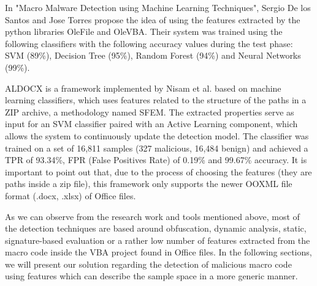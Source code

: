 \par
In "Macro Malware Detection using Machine Learning Techniques"\cite{SantosT17}, Sergio De los Santos and Jose Torres propose the idea of using the features extracted by the python libraries OleFile and OleVBA. Their system was trained  using the following classifiers with the following accuracy values during the test phase: SVM (89\%),  Decision Tree (95\%), Random Forest (94\%) and Neural Networks (99\%). 
\par
ALDOCX is a framework implemented by Nisam et al.\cite{NissimCE17} based on machine learning classifiers, which uses features related to the structure of the paths in a ZIP archive, a methodology named SFEM. The extracted properties serve as input for an SVM classifier paired with an Active Learning component, which allows the system to continuously update the detection model. The classifier was trained on a set of 16,811 samples (327 malicious, 16,484 benign) and achieved a TPR of 93.34\%, FPR (False Positives Rate) of 0.19\% and 99.67\% accuracy. It is important to point out that, due to the process of choosing the features (they are paths inside a zip file), this framework only supports the newer OOXML file format (.docx, .xlsx) of Office files.
\par
As we can observe from the research work and tools mentioned above, most of the detection techniques are based around obfuscation, dynamic analysis, static, signature-based evaluation or a rather low number of features extracted from the macro code inside the VBA project found in Office files.
In the following sections, we will present our solution regarding the detection of malicious macro code using features which can describe the sample space in a more generic manner.